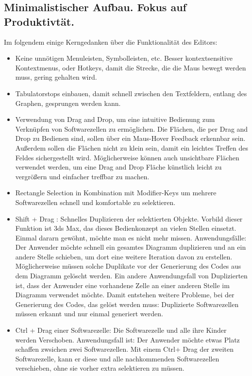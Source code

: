 \documentclass[11pt]{article}
\begin{document}
\subsection{Minimalistischer Aufbau. Fokus auf Produktivtät.}
\label{sec:orgheadline22}
Im folgendem einige Kerngedanken über die Funktionalität des Editors:

\begin{itemize}
\item Keine unnötigen Menuleisten, Symbolleisten, etc. Besser kontextsensitive
Kontextmenus, oder Hotkeys,  damit die Strecke, die die Maus bewegt werden muss, gering
gehalten wird.
\item Tabulatorstops einbauen, damit schnell zwischen den Textfeldern, entlang des
Graphen, gesprungen werden kann.
\item Verwendung von Drag and Drop, um eine intuitive Bedienung zum Verknüpfen von
Softwarezellen zu ermöglichen. Die Flächen, die per Drag and Drop zu Bedienen
sind, sollen über ein Maus-Hover Feedback erkennbar sein. Außerdem sollen die
Flächen nicht zu klein sein, damit ein leichtes Treffen des Feldes
sichergestellt wird. Möglicherweise können auch unsichtbare Flächen verwendet
werden, um eine Drag and Drop Fläche künstlich leicht zu vergrößern und einfacher treffbar zu machen.
\item Rectangle Selection in Kombination mit Modifier-Keys um mehrere Softwarezellen
schnell und komfortable zu selektieren.
\item Shift + Drag : Schnelles Duplizieren der selektierten Objekte. Vorbild dieser
Funktion ist 3ds Max, das dieses Bedienkonzept an vielen Stellen einsetzt.
Einmal dararn gewöhnt, möchte man es nicht mehr missen. Anwendungsfälle:
Der Anwender möchte  schnell ein gesamtes Diagramm duplizieren und an ein andere Stelle schieben, um
dort eine weitere Iteration davon zu erstellen. Möglicherweise müssen solche
Duplikate vor der Generierung des Codes aus dem Diagramm gelöscht werden.
Ein andere Anwendungsfall von Duplizierten ist, dass der Anwender eine vorhandene
Zelle an einer anderen Stelle im Diagramm verwendet möchte. Damit
entstehen weitere Probleme, bei der Generierung des Codes, das gelöst werden
muss: Duplizierte Softwarezellen müssen erkannt und nur einmal generiert werden.
\item Ctrl + Drag einer Softwarezelle: Die Softwarezelle und alle ihre Kinder werden
Verschoben. Anwendungsfall ist: Der Anwender möchte etwas Platz schaffen
zwsichen zwei Softwarezellen. Mit einem Ctrl+ Drag der zweiten Softwarezelle,
kann er diese und alle nachkommenden Softwarezellen verschieben, ohne sie
vorher extra selektieren zu müssen.
\end{itemize}
\end{document}
